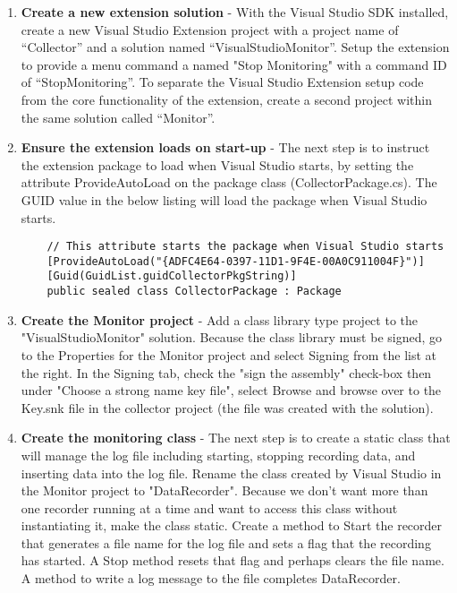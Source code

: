 \begin{enumerate}

\item {\bf Create a new extension solution} - 
With the Visual Studio SDK installed, create a new Visual Studio Extension project with a project name of ``Collector'' and a solution named ``VisualStudioMonitor''.  Setup the extension to provide a menu command a named "Stop Monitoring" with a command ID of ``StopMonitoring''.
To separate the Visual Studio Extension setup code from the core functionality of the extension, create a second project within the same solution called  ``Monitor''.

\item {\bf Ensure the extension loads on start-up} - The next step is to instruct the extension package to load when Visual Studio starts, by setting the attribute ProvideAutoLoad on the package class (CollectorPackage.cs). The GUID value in the below listing will load the package when Visual Studio starts.

\begin{lstlisting}
    // This attribute starts the package when Visual Studio starts 
    [ProvideAutoLoad("{ADFC4E64-0397-11D1-9F4E-00A0C911004F}")]
    [Guid(GuidList.guidCollectorPkgString)]
    public sealed class CollectorPackage : Package
\end{lstlisting}

\item {\bf Create the Monitor project} - Add a class library type project to  the "VisualStudioMonitor" solution. Because the class library must be signed, go to the Properties for the Monitor project and select Signing from the list at the right.  In the Signing tab, check the "sign the assembly" check-box then under "Choose a strong name key file", select Browse and browse over to the Key.snk file in the collector project (the file was created with the solution).

\item {\bf Create the monitoring class} - 
The next step is to create a static class that will manage the log file including starting, stopping recording data, and inserting data into the log file.  Rename the class created by Visual Studio in the Monitor project to "DataRecorder".    Because we don't want more than one recorder running at a time and want to access this class without instantiating it, make the class static.  Create a method to Start the recorder that generates a file name for the log file and sets a flag that the recording has started. A Stop method resets that flag and perhaps clears the file name.  A method to write a log message to the file completes DataRecorder.


\end{enumerate}
